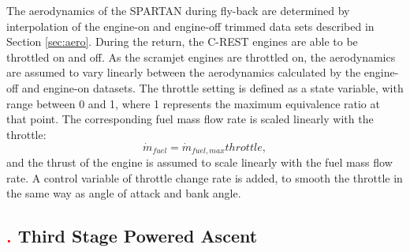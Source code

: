  
 
 The aerodynamics of the SPARTAN during fly-back are determined by interpolation of the engine-on and engine-off trimmed data sets described in Section \ref{sec:aero}.
During the return, the C-REST engines are able to be throttled on and off. 
 As the scramjet engines are throttled on, the aerodynamics are assumed to vary linearly between the aerodynamics calculated by the engine-off and engine-on datasets. 
The throttle setting is defined as a state variable, with range between 0 and 1, where 1 represents the maximum equivalence ratio at that point. The corresponding fuel mass flow rate is scaled linearly with the throttle:  
\begin{equation}
\dot{m}_{fuel} = \dot{m}_{fuel,max}throttle,
\end{equation}
and the thrust of the engine is assumed to scale linearly with the fuel mass flow rate. A control variable of throttle change rate is added, to smooth the throttle in the same way as angle of attack and bank angle. 

 

\subsection{\textcolor{red}{.} Third Stage Powered Ascent}


